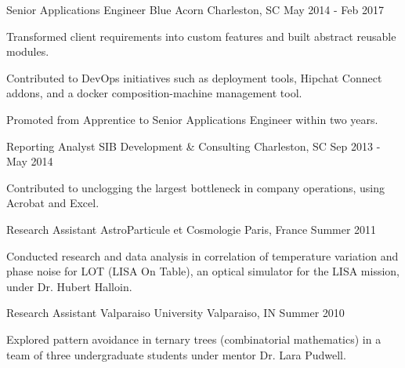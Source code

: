 

\begin{cventries}

  \cventry
    {Senior Applications Engineer} %
    {Blue Acorn} %
    {Charleston, SC} %
    {May 2014 - Feb 2017} %
    {
      \begin{cvitems} %
        \item {Transformed client requirements into custom features and built abstract reusable modules.}
        \item {Contributed to DevOps initiatives such as deployment tools, Hipchat Connect addons, and a docker composition-machine management tool.}
        \item {Promoted from Apprentice to Senior Applications Engineer within two years.}
      \end{cvitems}
    }

  \cventry
    {Reporting Analyst}
    {SIB Development \& Consulting}
    {Charleston, SC}
    {Sep 2013 - May 2014}
    {
      \begin{cvitems}
        \item {Contributed to unclogging the largest bottleneck in company operations, using Acrobat and Excel.}
      \end{cvitems}
    }

  \cventry
    {Research Assistant}
    {AstroParticule et Cosmologie}
    {Paris, France}
    {Summer 2011}
    {
      \begin{cvitems}
        \item {Conducted research and data analysis in correlation of temperature variation and phase noise for LOT (LISA On Table), an optical simulator for the LISA mission, under Dr. Hubert Halloin.}
      \end{cvitems}
    }

  \cventry
    {Research Assistant}
    {Valparaiso University}
    {Valparaiso, IN}
    {Summer 2010}
    {
      \begin{cvitems}
        \item {Explored pattern avoidance in ternary trees (combinatorial mathematics) in a team of three undergraduate students under mentor Dr. Lara Pudwell.}
      \end{cvitems}
    }

\end{cventries}
